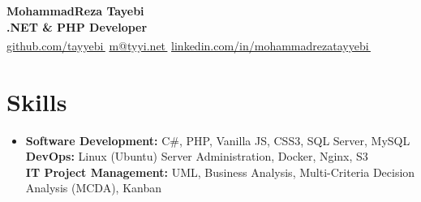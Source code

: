 \documentclass[11pt,a4paper]{article}
\let\orighref\href
\renewcommand{\href}[2]{\orighref{#1}{#2\,{\textsuperscript{\tiny{\textcolor{heritagered}{\faExternalLink}}}}}}
\begin{document}
\graphicspath{ {./img} }


    \textbf{\textcolor{ultramarine}{\Large MohammadReza Tayebi}}
    \\
    \textbf{.NET \& PHP Developer}
    \\
    \small\href{https://github.com/tayyebi}{github.com/tayyebi}
    \small\href{mailto:m@tyyi.net}{m@tyyi.net}
    \small\href{https://www.linkedin.com/in/mohammadrezatayyebi/}{linkedin.com/in/mohammadrezatayyebi}
    \vspace{-20pt}





\section{Skills}
 \begin{itemize}[leftmargin=0.15in, label={}]
    \item {
        \textbf{Software Development:}
        C\#, PHP, Vanilla JS, CSS3, SQL Server, MySQL
        \\
        \textbf{DevOps:}
        Linux (Ubuntu) Server Administration, Docker, Nginx, S3 
        \\
        \textbf{IT Project Management:}
        {UML},
        {Business Analysis},
        {Multi-Criteria Decision Analysis (MCDA)},
        {Kanban}
    }
     
 \end{itemize}
\end{document}

